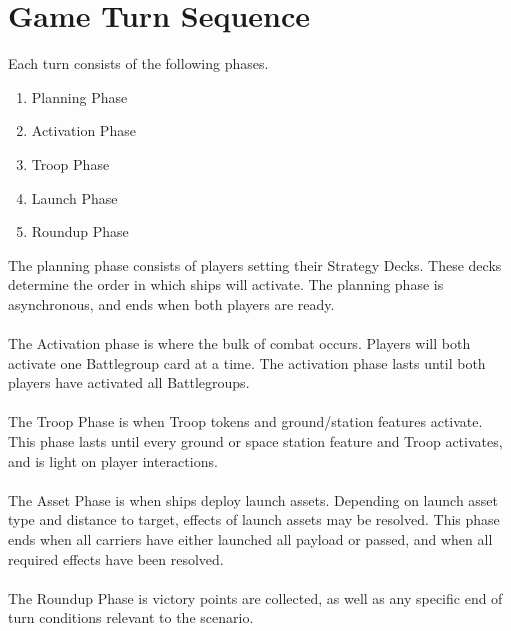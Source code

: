 \chapter{Game Turn Sequence}

Each turn consists of the following phases.

\begin{enumerate}
	\item Planning Phase
	\item Activation Phase
	\item Troop Phase
	\item Launch Phase
	\item Roundup Phase
\end{enumerate}

The planning phase consists of players setting their Strategy Decks. These decks determine the order in which ships will activate. The planning phase is asynchronous, and ends when both players are ready.
\\\\
The Activation phase is where the bulk of combat occurs. Players will both activate one Battlegroup card at a time. The activation phase lasts until both players have activated all Battlegroups.
\\\\
The Troop Phase is when Troop tokens and ground/station features activate. This phase lasts until every ground or space station feature and Troop activates, and is light on player interactions.
\\\\
The Asset Phase is when ships deploy launch assets. Depending on launch asset type and distance to target, effects of launch assets may be resolved. This phase ends when all carriers have either launched all payload or passed, and when all required effects have been resolved.
\\\\
The Roundup Phase is victory points are collected, as well as any specific end of turn conditions relevant to the scenario.